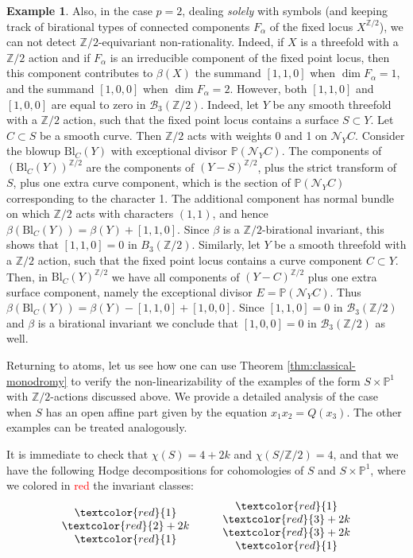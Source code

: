 \documentclass[12pt,a4paper]{amsart}
\theoremstyle{definition}
\newtheorem{example}[theorem]{Example}
\theoremstyle{remark}
\newcommand{\Z}{\mathbb{Z}}
\begin{document}
\begin{example}
 Also, in the case $p=2$, dealing \textit{solely} with symbols (and keeping track of birational types of connected components $F_\alpha$ of the fixed locus $X^{\Z/2}$), we can not detect $\Z/2$-equivariant non-rationality. Indeed, if $X$ is a threefold with a $\Z/2$ action and if $F_\alpha$ is an
irreducible component of the fixed point locus, then this component
contributes to $\beta(X)$ the summand $[1,1,0]$ when $\dim F_\alpha = 1$,
and the summand $[1,0,0]$ when $\dim F_\alpha = 2$. However, both $[1,1,0]$
and $[1,0,0]$ are equal to zero in ${\mathcal B}_3(\Z/2)$. Indeed, let $Y$ be any smooth
threefold with a $\Z/2$ action, such that the fixed point locus contains
a surface $S \subset Y$. Let $C \subset S$ be a smooth curve. Then $\Z/2$
acts with weights 0 and 1 on $\mathcal{N}_YC$. Consider the blowup $\mathrm{Bl}_C(Y)$ with
exceptional divisor $\mathbb{P}(\mathcal{N}_YC)$. The components of $(\mathrm{Bl}_C(Y))^{\Z/2}$ are
the components of $(Y - S)^{\Z/2}$, plus the strict transform of $S$, plus
one extra curve component, which is the section of $\mathbb{P}(\mathcal{N}_YC)$
corresponding to the character 1. The additional component has normal
bundle on which $\Z/2$ acts with characters $(1,1)$, and hence
$\beta(\mathrm{Bl}_C(Y)) = \beta(Y) + [1,1,0]$. Since $\beta$ is a $\Z/2$-birational
invariant, this shows that $[1,1,0] = 0$ in $B_3(\Z/2)$. Similarly, let $Y$
be a smooth threefold with a $\Z/2$ action, such that the fixed point
locus contains a curve component $C \subset Y$. Then, in $\mathrm{Bl}_C(Y)^{\Z/2}$
we have all components of $(Y-C)^{\Z/2}$ plus one extra surface
component, namely the exceptional divisor $E = \mathbb{P}(\mathcal{N}_YC)$. Thus
$\beta(\mathrm{Bl}_C(Y)) = \beta(Y) - [1,1,0] + [1,0,0]$. Since $[1,1,0] = 0$ in
${\mathcal B}_3(\Z/2)$ and $\beta$ is a birational invariant we conclude that $[1,0,0] = 0$
in ${\mathcal B}_3(\Z/2)$ as well.

 Returning to atoms, let us see how one can use Theorem \ref{thm:classical-monodromy} to verify the non-linearizability of the examples of the form $S\times \mathbb P^1$ with $\mathbb Z/2$-actions discussed above. We provide a detailed analysis of the case when $S$ has an open affine part given by the equation $x_1x_2=Q(x_3)$. The other examples can be treated analogously. 

It is immediate to check that $\chi(S)=4+2k$ and $\chi(S/\mathbb Z/2)=4$, and that we have the following Hodge decompositions for cohomologies of $S$ and $S\times \mathbb P^1$, where we colored in \textcolor{red}{red} the invariant classes:
\[
\begin{array}{c}
    \textcolor{red}{1} \\
    \textcolor{red}{2} + 2k \\
    \textcolor{red}{1}
\end{array} \quad \quad 
\begin{array}{c}
    \textcolor{red}{1} \\
    \textcolor{red}{3} + 2k \\
    \textcolor{red}{3} + 2k \\
    \textcolor{red}{1}
\end{array}
\]




\end{example}
\end{document}
